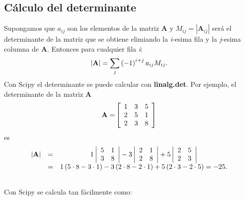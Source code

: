 \documentclass[letterpaper,10pt,spanish]{sphinxmanual}
\begin{document}
\subsection{Cálculo del determinante}
\label{calculo_numerico:calculo-del-determinante}
Supongamos que  $a_{ij}$ son los elementos de la matriz  $\mathbf{A}$ y  $M_{ij}=\left|\mathbf{A}_{ij}\right|$ será el determinante de la matriz que se obtiene elimiando la \emph{i}-esima fila y la \emph{j}-esima columna de   $\mathbf{A}$. Entonces para cualquier fila \emph{i}:
\begin{gather}
\begin{split}\left|\mathbf{A}\right|=\sum_{j}\left(-1\right)^{i+j}a_{ij}M_{ij}.\end{split}\notag
\end{gather}
Con Scipy el determinante se puede calcular con \textbf{linalg.det}. Por ejemplo, el determinante de la matriz \textbf{A}
\begin{gather}
\begin{split}\mathbf{A=}\left[\begin{array}{ccc} 1 & 3 & 5\\ 2 & 5 & 1\\ 2 & 3 & 8\end{array}\right]\end{split}\notag
\end{gather}
es
\begin{gather}
\begin{split}\begin{array}{ccc} \left|\mathbf{A}\right| & = & 1\left|\begin{array}{cc} 5 & 1\\ 3 & 8\end{array}\right|-3\left|\begin{array}{cc} 2 & 1\\ 2 & 8\end{array}\right|+5\left|\begin{array}{cc} 2 & 5\\ 2 & 3\end{array}\right|\\ & = & 1\left(5\cdot8-3\cdot1\right)-3\left(2\cdot8-2\cdot1\right)+5\left(2\cdot3-2\cdot5\right)=-25.\end{array}\end{split}\notag\\\begin{split}\end{split}\notag
\end{gather}
Con Scipy se calcula tan fácilmente como:
\end{document}

